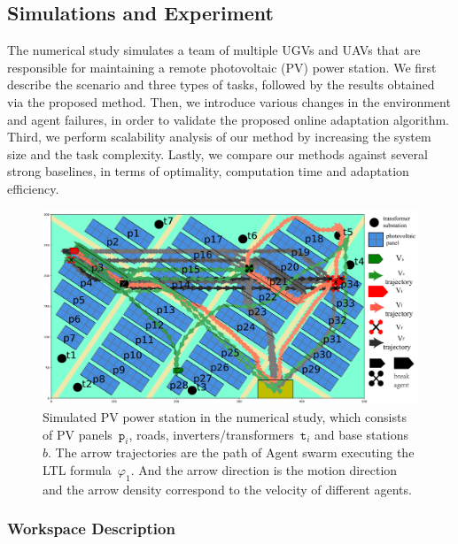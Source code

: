 \subsection{Simulations and Experiment}\label{subsec:simulation}


The numerical study simulates a team of multiple UGVs and UAVs
that are responsible for maintaining a remote photovoltaic (PV) power station.
We first describe the scenario and three types of tasks,
followed by the results obtained via the proposed method.
Then, we introduce various changes in the environment and agent failures,
in order to validate the proposed online adaptation algorithm.
Third, we perform scalability analysis of our method by increasing
the system size and the task complexity.
Lastly, we compare our methods against several strong baselines, in terms of
optimality, computation time and adaptation efficiency.


\begin{figure}
\includegraphics[scale=0.18]{figures/background3.pdf}
\caption{Simulated PV power station in the numerical study,
  which consists of PV panels~$\texttt{p}_i$, roads,
  inverters/transformers~$\texttt{t}_i$ and base stations~$b$.
  The arrow trajectories are the path of Agent swarm
  executing the LTL formula~$\varphi_{1}$. And the arrow direction
  is the motion direction and the arrow density correspond to the velocity of different agents.}
\label{fig:workspace}
\end{figure}

\subsubsection{Workspace Description}\label{subsubsec:ws}

